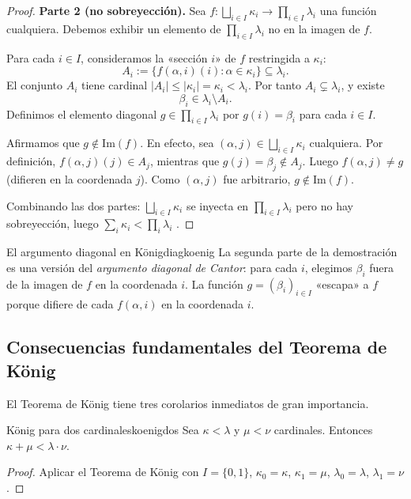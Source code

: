 \begin{proof}
\textbf{Parte 2 (no sobreyección).} Sea $f \colon \bigsqcup_{i \in I} \kappa_i \to \prod_{i \in I} \lambda_i$ una función cualquiera. Debemos exhibir un elemento de $\prod_{i \in I} \lambda_i$ no en la imagen de $f$.

Para cada $i \in I$, consideramos la «sección $i$» de $f$ restringida a $\kappa_i$:
\[
  A_i := \{f(\alpha, i)(i) : \alpha \in \kappa_i\} \subseteq \lambda_i.
\]
El conjunto $A_i$ tiene cardinal $|A_i| \leq |\kappa_i| = \kappa_i < \lambda_i$. Por tanto $A_i \subsetneq \lambda_i$, y existe
\[
  \beta_i \in \lambda_i \setminus A_i.
\]
Definimos el elemento diagonal $g \in \prod_{i \in I} \lambda_i$ por $g(i) = \beta_i$ para cada $i \in I$.

Afirmamos que $g \notin \mathrm{Im}(f)$. En efecto, sea $(\alpha, j) \in \bigsqcup_{i \in I} \kappa_i$ cualquiera. Por definición, $f(\alpha, j)(j) \in A_j$, mientras que $g(j) = \beta_j \notin A_j$. Luego $f(\alpha, j) \neq g$ (difieren en la coordenada $j$). Como $(\alpha, j)$ fue arbitrario, $g \notin \mathrm{Im}(f)$.

Combinando las dos partes: $\bigsqcup_{i \in I} \kappa_i$ se inyecta en $\prod_{i \in I} \lambda_i$ pero no hay sobreyección, luego $\sum_i \kappa_i < \prod_i \lambda_i$ \cite{konig1905, jech2003, kunen2011}.
\end{proof}

\begin{observacion}{El argumento diagonal en König}{diagkoenig}
La segunda parte de la demostración es una versión del \emph{argumento diagonal de Cantor}: para cada $i$, elegimos $\beta_i$ fuera de la imagen de $f$ en la coordenada $i$. La función $g = (\beta_i)_{i \in I}$ «escapa» a $f$ porque difiere de cada $f(\alpha, i)$ en la coordenada $i$.
\end{observacion}

\subsection{Consecuencias fundamentales del Teorema de König}

El Teorema de König tiene tres corolarios inmediatos de gran importancia.

\begin{corolario}{König para dos cardinales}{koenigdos}
Sea $\kappa < \lambda$ y $\mu < \nu$ cardinales. Entonces $\kappa + \mu < \lambda \cdot \nu$.
\end{corolario}

\begin{proof}
Aplicar el Teorema de König con $I = \{0, 1\}$, $\kappa_0 = \kappa$, $\kappa_1 = \mu$, $\lambda_0 = \lambda$, $\lambda_1 = \nu$.
\end{proof}

